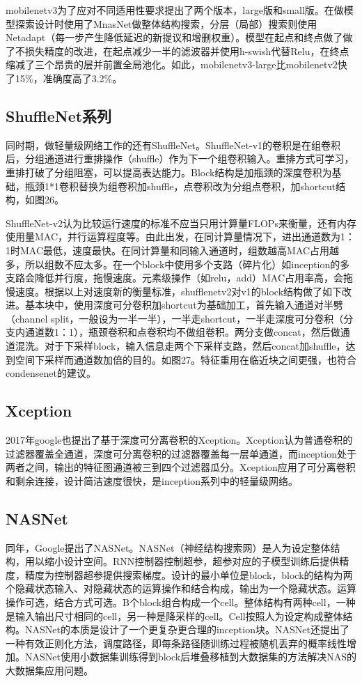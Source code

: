 \documentclass[15pt]{article}
\begin{document}
mobilenetv3\cite{ref85}为了应对不同适用性要求提出了两个版本，large版和small版。在做模型探索设计时使用了MnasNet做整体结构搜索，分层（局部）搜索则使用Netadapt（每一步产生降低延迟的新提议和增删权重）。模型在起点和终点做了做了不损失精度的改进，在起点减少一半的滤波器并使用h-swish代替Relu，在终点缩减了三个昂贵的层并前置全局池化。如此，mobilenetv3-large比mobilenetv2快了15\%，准确度高了3.2\%。

\subsection{ShuffleNet系列}
同时期，做轻量级网络工作的还有ShuffleNet。ShuffleNet-v1\cite{ref86}的卷积是在组卷积后，分组通道进行重排操作（shuffle）作为下一个组卷积输入。重排方式可学习，重排打破了分组阻塞，可以提高表达能力。Block结构是加瓶颈的深度卷积为基础，瓶颈1*1卷积替换为组卷积加shuffle，点卷积改为分组点卷积，加shortcut结构，如图26。

ShuffleNet-v2\cite{ref87}认为比较运行速度的标准不应当只用计算量FLOPs来衡量，还有内存使用量MAC，并行运算程度等。由此出发，在同计算量情况下，进出通道数为1：1时MAC最低，速度最快。在同计算量和同输入通道时，组数越高MAC占用越多，所以组数不应太多。在一个block中使用多个支路（碎片化）如inception的多支路会降低并行度，拖慢速度。元素级操作（如relu，add）MAC占用率高，会拖慢速度。根据以上对速度新的衡量标准，shufflenetv2对v1的block结构做了如下改进。基本块中，使用深度可分卷积加shortcut为基础加工，首先输入通道对半劈（channel split，一般设为一半一半），一半走shortcut，一半走深度可分卷积（分支内通道数1：1），瓶颈卷积和点卷积均不做组卷积。两分支做concat，然后做通道混洗。对于下采样block，输入信息走两个下采样支路，然后concat加shuffle，达到空间下采样而通道数加倍的目的。如图27。特征重用在临近块之间更强，也符合condensenet的建议。

\subsection{Xception}
2017年google也提出了基于深度可分离卷积的Xception\cite{ref88}。Xception认为普通卷积的过滤器覆盖全通道，深度可分离卷积的过滤器覆盖每一层单通道，而inception处于两者之间，输出的特征图通道被三到四个过滤器瓜分。Xception应用了可分离卷积和剩余连接，设计简洁速度很快，是inception系列中的轻量级网络。

\subsection{NASNet}
同年，Google提出了NASNet\cite{ref89}。NASNet（神经结构搜索网）是人为设定整体结构，用以缩小设计空间。RNN控制器控制超参，超参对应的子模型训练后提供精度，精度为控制器超参提供搜索梯度。设计的最小单位是block，block的结构为两个隐藏状态输入、对隐藏状态的运算操作和结合构成，输出为一个隐藏状态。运算操作可选，结合方式可选。B个block组合构成一个cell。整体结构有两种cell，一种是输入输出尺寸相同的cell，另一种是降采样的cell。Cell按照人为设定构成整体结构。NASNet的本质是设计了一个更复杂更合理的inception块。NASNet还提出了一种有效正则化方法，调度路径，即每条路径随训练过程被随机丢弃的概率线性增加。NASNet使用小数据集训练得到block后堆叠移植到大数据集的方法解决NAS的大数据集应用问题。
\end{document}
